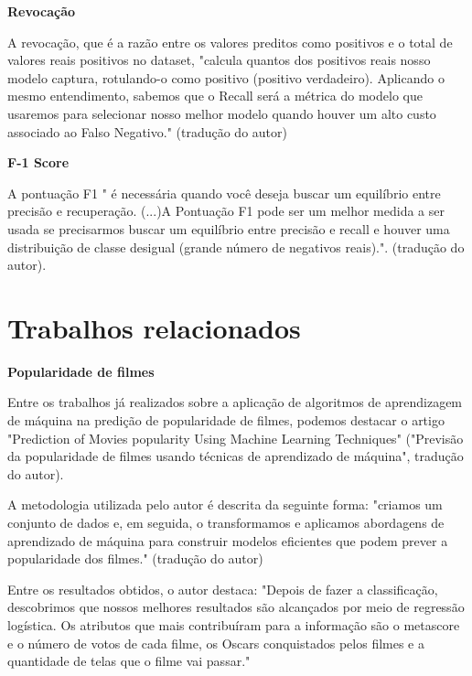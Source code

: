 	        \textbf{Revocação}\par
	        A revocação, que é a razão entre os valores preditos como positivos e o total de valores reais positivos no dataset, "calcula quantos dos positivos reais nosso modelo captura, rotulando-o como positivo (positivo verdadeiro). Aplicando o mesmo entendimento, sabemos que o Recall será a métrica do modelo que usaremos para selecionar nosso melhor modelo quando houver um alto custo associado ao Falso Negativo." \cite{towards2020} (tradução do autor)

	        \textbf{F-1 Score}\par
	        A pontuação F1 " é necessária quando você deseja buscar um equilíbrio entre precisão e recuperação. (...)A Pontuação F1 pode ser um melhor medida a ser usada se precisarmos buscar um equilíbrio entre precisão e recall e houver uma distribuição de classe desigual (grande número de negativos reais).". \cite{towards2020} (tradução do autor).\newline

    \section{Trabalhos relacionados}

        \textbf{Popularidade de filmes}\par

        Entre os trabalhos já realizados sobre a aplicação de algoritmos de aprendizagem de máquina na predição de popularidade de filmes, podemos destacar o artigo "Prediction of Movies popularity Using Machine Learning Techniques" ("Previsão da popularidade de filmes usando técnicas de aprendizado de máquina", tradução do autor).\par
        A metodologia utilizada pelo autor é descrita da seguinte forma: "criamos um conjunto de dados e, em seguida, o transformamos e aplicamos abordagens de aprendizado de máquina para construir modelos eficientes que podem prever a popularidade dos filmes." \cite{afzal2016} (tradução do autor)\par
        Entre os resultados obtidos, o autor destaca: "Depois de fazer a classificação, descobrimos que nossos melhores resultados são alcançados por meio de regressão logística. Os atributos que mais contribuíram para a informação são o metascore e o número de votos de cada filme, os Oscars conquistados pelos filmes e a quantidade de telas que o filme vai passar." \cite{afzal2016}\newline

